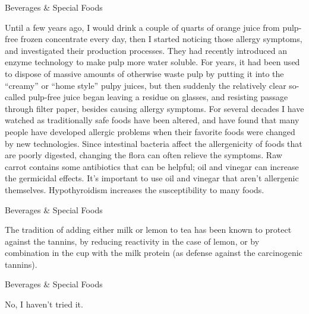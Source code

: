 \documentclass[11pt,oneside,openany,extrafontsizes]{memoir}
\begin{document}
\begin{standalonequote}{Beverages \& Special Foods}

    \begin{answer}
        Until a few years ago, I would drink a couple of quarts of orange juice from pulp-free frozen concentrate every day, then I started noticing those allergy symptoms, and investigated their production processes. They had recently introduced an enzyme technology to make pulp more water soluble. For years, it had been used to dispose of massive amounts of otherwise waste pulp by putting it into the \enquote{creamy} or \enquote{home style} pulpy juices, but then suddenly the relatively clear so-called pulp-free juice began leaving a residue on glasses, and resisting passage through filter paper, besides causing allergy symptoms. For several decades I have watched as traditionally safe foods have been altered, and have found that many people have developed allergic problems when their favorite foods were changed by new technologies. Since intestinal bacteria affect the allergenicity of foods that are poorly digested, changing the flora can often relieve the symptoms. Raw carrot contains some antibiotics that can be helpful; oil and vinegar can increase the germicidal effects. It's important to use oil and vinegar that aren't allergenic themselves. Hypothyroidism increases the susceptibility to many foods.
    \end{answer}
\end{standalonequote}

\begin{standalonequote}{Beverages \& Special Foods}

    \begin{answer}
        The tradition of adding either milk or lemon to tea has been known to protect against the tannins, by reducing reactivity in the case of lemon, or by combination in the cup with the milk protein (as defense against the carcinogenic tannins).
    \end{answer}
\end{standalonequote}

\begin{standalonequote}{Beverages \& Special Foods}

    \begin{answer}
        No, I haven't tried it.
    \end{answer}
\end{standalonequote}
\end{document}
